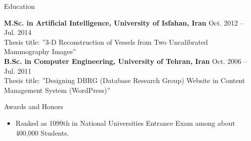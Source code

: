 \documentclass{resume} %
\begin{document}

\begin{rSection}{Education}

{\bf M.Sc. in Artificial Intelligence, University of Isfahan, Iran} \hfill {Oct. 2012 -- Jul. 2014} \\ 
Thesis title: ''3-D Reconstruction of Vessels from Two Uncalibrated Mammography Images''\\
\linebreak
{\bf B.Sc. in Computer Engineering, University of Tehran, Iran} \hfill {Oct. 2006 -- Jul. 2011} \\ 
Thesis title: ''Designing DBRG (Database Research Group) Website in Content Management System (WordPress)''

\end{rSection}


\begin{rSection}{Awards and Honors}
	\begin{itemize}
		\item{Ranked as 1099th in National Universities Entrance Exam among about 400,000 Students.}\vspace{-0.2cm}
	\end{itemize}
\end{rSection}
\end{document}
